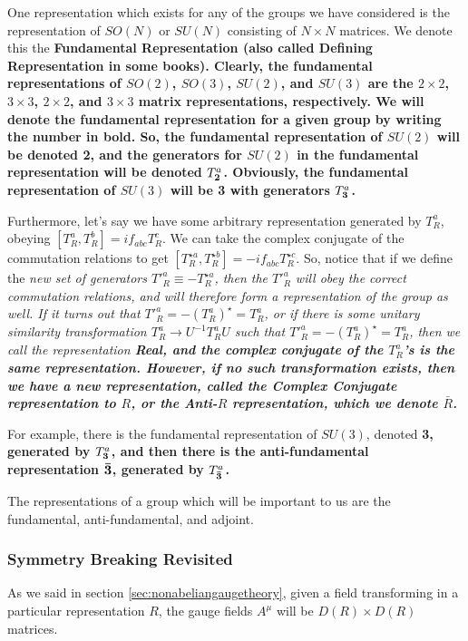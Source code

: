 \documentclass[12pt,epsf]{article}
\begin{document}
One representation which exists for any of the groups we have
considered is the representation of $SO(N)$ or $SU(N)$ consisting of
$N\times N$ matrices.  We denote this the \bf Fundamental
Representation \rm (also called \bf Defining Representation \rm in some
books).  Clearly, the fundamental representations of $SO(2)$, $SO(3)$,
$SU(2)$, and $SU(3)$ are the $2\times 2$, $3\times 3$, $2\times 2$, and
$3\times 3$ matrix representations, respectively.  We will denote the
fundamental representation for a given group by writing the number in
bold.  So, the fundamental representation of $SU(2)$ will be denoted
\bf 2\rm, and the generators for $SU(2)$ in the fundamental
representation will be denoted $T^a_{\bf 2\rm}$.  Obviously, the
fundamental representation of $SU(3)$ will be \bf 3 \rm with generators
$T^a_{\bf 3\rm}$.  

Furthermore, let's say we have some arbitrary representation generated
by $T^a_R$, obeying $[T^a_R,T^b_R] = if_{abc}T^c_R$.  We can take the
complex conjugate of the commutation relations to get $[T^{\star
a}_R,T^{\star b}_R] = -if_{abc}T^{\star c}_R$.	So, notice that if we
define the \it new \rm set of generators $T'^a_R \equiv -T^{\star
a}_R$, then the $T'^a_R$ will obey the correct commutation relations,
and will therefore form a representation of the group as well.	If it
turns out that $T'^a_R	= -(T^a_R)^{\star} = T^a_R$, or if there is
some unitary similarity transformation $T^a_R \rightarrow U^{-1}T^a_RU$
such that $T'^a_R = -(T^a_R)^{\star} = T^a_R$, then we call the
representation \bf Real\rm, and the complex conjugate of the $T^a_R$'s
is the same representation.  However, if no such transformation exists,
then we have a \it new \rm representation, called the \bf Complex
Conjugate \rm representation to $R$, or the \bf Anti-{\boldmath$R$} \rm
representation, which we denote $\bar R$.  

For example, there is the fundamental representation of $SU(3)$,
denoted \bf 3\rm, generated by $T^a_{\bf 3\rm}$, and then there is the
anti-fundamental representation $\bf \bar 3\rm$, generated by $T^a_{\bf
\bar 3\rm}$.  

The representations of a group which will be important to us are the
fundamental, anti-fundamental, and adjoint.  

\subsubsection{Symmetry Breaking Revisited}

As we said in section \ref{sec:nonabeliangaugetheory}, given a field
transforming in a particular representation $R$, the gauge fields
$A^{\mu}$ will be $D(R)\times D(R)$ matrices.  
\end{document}
